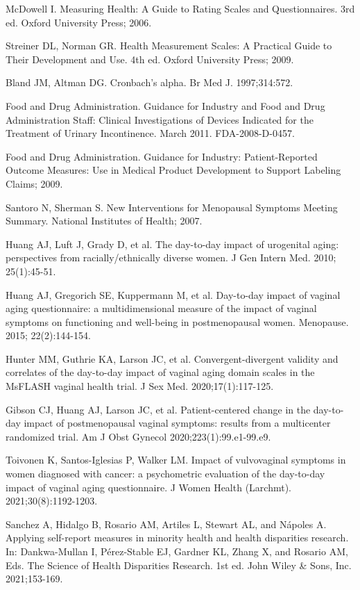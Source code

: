 \begin{references}
\item McDowell I. Measuring Health: A Guide to Rating Scales and Questionnaires. 3rd ed. Oxford University Press; 2006.
\item Streiner DL, Norman GR. Health Measurement Scales: A Practical Guide to Their Development and Use. 4th ed. Oxford University Press; 2009.
\item Bland JM, Altman DG. Cronbach’s alpha. Br Med J. 1997;314:572.
\item Food and Drug Administration. Guidance for Industry and Food and Drug Administration Staff: Clinical Investigations of Devices Indicated for the Treatment of Urinary Incontinence. March 2011. FDA-2008-D-0457.
\item Food and Drug Administration. Guidance for Industry: Patient-Reported Outcome Measures: Use in Medical Product Development to Support Labeling Claims; 2009.
\item Santoro N, Sherman S. New Interventions for Menopausal Symptoms Meeting Summary. National Institutes of Health; 2007.
\item Huang AJ, Luft J, Grady D, et al. The day-to-day impact of urogenital aging: perspectives from racially/ethnically diverse women. J Gen Intern Med. 2010; 25(1):45-51.
\item Huang AJ, Gregorich SE, Kuppermann M, et al. Day-to-day impact of vaginal aging questionnaire: a multidimensional measure of the impact of vaginal symptoms on functioning and well-being in postmenopausal women. Menopause. 2015; 22(2):144-154.
\item Hunter MM, Guthrie KA, Larson JC, et al. Convergent-divergent validity and correlates of the day-to-day impact of vaginal aging domain scales in the MsFLASH vaginal health trial. J Sex Med. 2020;17(1):117-125.
\item Gibson CJ, Huang AJ, Larson JC, et al. Patient-centered change in the day-to-day impact of postmenopausal vaginal symptoms: results from a multicenter randomized trial. Am J Obst Gynecol 2020;223(1):99.e1-99.e9.
\item Toivonen K, Santos-Iglesias P, Walker LM. Impact of vulvovaginal symptoms in women diagnosed with cancer: a psychometric evaluation of the day-to-day impact of vaginal aging questionnaire. J Women Health (Larchmt). 2021;30(8):1192-1203.
\item Sanchez A, Hidalgo B, Rosario AM, Artiles L, Stewart AL, and Nápoles A. Applying self-report measures in minority health and health disparities research. In: Dankwa-Mullan I, Pérez-Stable EJ, Gardner KL, Zhang X, and Rosario AM, Eds. The Science of Health Disparities Research. 1st ed. John Wiley \& Sons, Inc. 2021;153-169.

\end{references}
